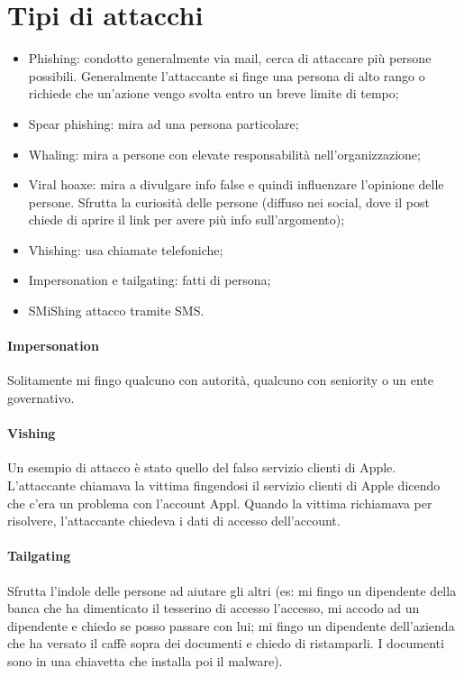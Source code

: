 \section{Tipi di attacchi}
\begin{itemize}
    \item Phishing: condotto generalmente via mail, cerca di attaccare più persone possibili. Generalmente l'attaccante si finge una persona di alto rango o richiede che un'azione vengo svolta entro un breve limite di tempo;
    \item Spear phishing: mira ad una persona particolare;
    \item Whaling: mira a persone con elevate responsabilità nell'organizzazione;
    \item Viral hoaxe: mira a divulgare info false e quindi influenzare l'opinione delle persone. Sfrutta la curiosità delle persone (diffuso nei social, dove il post chiede di aprire il link per avere più info sull'argomento);
    \item Vhishing: usa chiamate telefoniche;
    \item Impersonation e tailgating: fatti di persona;
    \item SMiShing attacco tramite SMS.
\end{itemize}

\paragraph{Impersonation} Solitamente mi fingo qualcuno con autorità, qualcuno con seniority o un ente governativo.

\paragraph{Vishing} Un esempio di attacco è stato quello del falso servizio clienti di Apple. L'attaccante chiamava la vittima fingendosi il servizio clienti di Apple dicendo che c'era un problema con l'account Appl. Quando la vittima richiamava per risolvere, l'attaccante chiedeva i dati di accesso dell'account.

\paragraph{Tailgating} Sfrutta l'indole delle persone ad aiutare gli altri (es: mi fingo un dipendente della banca che ha dimenticato il tesserino di accesso l'accesso, mi accodo ad un dipendente e chiedo se posso passare con lui; mi fingo un dipendente dell'azienda che ha versato il caffè sopra dei documenti e chiedo di ristamparli. I documenti sono in una chiavetta che installa poi il malware).

